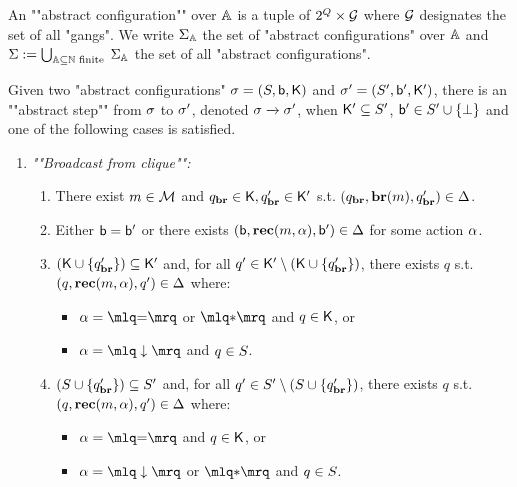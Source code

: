 \begin{definition}
	\label{def:abstract-configuration}
	An ""abstract configuration"" over $\mathbb{A}$ is a tuple of $2^Q \times \mathcal{G}$ where $\mathcal{G}$ designates the set of all "gangs". We write $\Sigma_{\mathbb{A}}$ the set of "abstract configurations" over $\mathbb{A}$ and $\Sigma := \bigcup_{\mathbb{A} \subseteq \mathbb{N} \text{ finite }}\Sigma_{\mathbb{A}}$ the set of all "abstract configurations". 
	
	Given two "abstract configurations" $\sigma = (S, \mathsf{b}, \mathsf{K})$ and $\sigma' = (S', \mathsf{b}', \mathsf{K}')$, there is an ""abstract step"" from $\sigma$ to $\sigma'$, denoted $\sigma \xrightarrow{} \sigma'$, when $\mathsf{K}' \subseteq S'$, $\mathsf{b}' \in S' \cup \{\bot\}$ and one of the following cases is satisfied.
	\begin{enumerate}
		\item \emph{""Broadcast from clique"":}
		\begin{enumerate}[label = (\arabic*)]
			\item\label{item:broadcast_from_clique_broadcast} There exist $m \in \mathcal{M}$ and $q_{\textbf{br}} \in \mathsf{K}, q_{\textbf{br}}' \in \mathsf{K}'$ s.t. $(q_{\textbf{br}}, \textbf{br}(m), q_{\textbf{br}}') \in \Delta$. 
			
			\item\label{item:broadcast_from_clique_boss} Either $\mathsf{b} = \mathsf{b}'$ or there exists $(\mathsf{b}, \textbf{rec}(m, \alpha), \mathsf{b}') \in \Delta$ for some action $\alpha$.
			
			\item\label{item:broadcast_from_clique_clique}$(\mathsf{K} \cup \{q_{\textbf{br}}'\}) \subseteq \mathsf{K}'$ and, for all $q' \in \mathsf{K}' \setminus (\mathsf{K} \cup \{q_{\textbf{br}}'\})$, there exists $q$ s.t. $(q, \textbf{rec}(m, \alpha), q') \in \Delta$ where:
			\begin{itemize}
				\item $\anact = \quotemarks{\eqtestact}$ or $\quotemarks{\dummyact}$ and $q \in \mathsf{K}$, or
				\item $\anact= \quotemarks{\enregact}$ and $q \in S$.
			\end{itemize}
			
			\item\label{item:broadcast_from_clique_covset}$(S \cup \{q_{\textbf{br}}'\}) \subseteq S'$ and, for all $q' \in S' \setminus (S \cup \{q_{\textbf{br}}'\})$, there exists $q$ s.t. $(q, \textbf{rec}(m, \alpha), q') \in \Delta$ where:
			\begin{itemize}
				\item  $\anact = \quotemarks{\eqtestact}$ and $q \in \mathsf{K}$, or
				\item $\anact = \quotemarks{\enregact}$ or $\quotemarks{\dummyact}$ and $q \in S$.
			\end{itemize}
		\end{enumerate}
		

\end{enumerate}
\end{definition}
